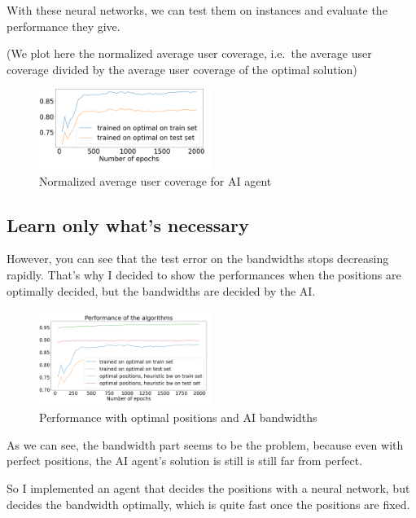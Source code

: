 \documentclass[letterpaper]{article}
\begin{document}
\;

With these neural networks, we can test them on instances and evaluate the performance they give.

(We plot here the normalized average user coverage, i.e.\, the average user coverage divided by the average user coverage of the optimal solution)


\begin{figure}[H]
    \centering
    \includegraphics[width=0.5\textwidth]{images/bilan_en _fonction epochs.png}
    \caption{Normalized average user coverage for AI agent}
\end{figure}

\subsection{Learn only what's necessary}

However, you can see that the test error on the bandwidths stops decreasing rapidly.
That's why I decided to show the performances when the positions are optimally decided, but the bandwidths are decided by the AI.

\begin{figure}[H]
    \centering
    \includegraphics[width=0.5\textwidth]{images/bilan_en _fonction epochs_aibw.png}
    \caption{Performance with optimal positions and AI bandwidths}
\end{figure}

As we can see, the bandwidth part seems to be the problem, because even with perfect positions, the AI agent's solution is still
is still far from perfect.

So I implemented an agent that decides the positions with a neural network, but decides the bandwidth optimally,
which is quite fast once the positions are fixed.
\end{document}
